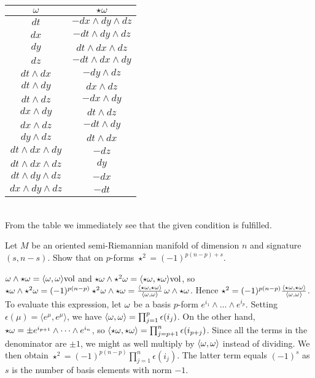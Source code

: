 \begin{tabular}{c|c}
$\omega$ & $\star\omega$\\\hline
$dt$ & $-dx\wedge dy\wedge dz$\\
$dx$ & $-dt\wedge dy\wedge dz$ \\
$dy$ & $dt\wedge dx\wedge dz$\\
$dz$ & $-dt\wedge dx\wedge dy$\\
$dt\wedge dx$ & $-dy\wedge dz$\\
$dt\wedge dy$ & $dx\wedge dz$ \\
$dt\wedge dz$ &$-dx\wedge dy$\\
$dx \wedge dy$ & $dt\wedge dz$ \\
$dx \wedge dz$ & $-dt\wedge dy$\\
$dy \wedge dz$ & $dt\wedge dx$\\
$dt\wedge dx\wedge dy$ & $-dz$ \\
$dt\wedge dx\wedge dz$ & $dy$\\
$dt\wedge dy\wedge dz$ & $-dx$\\
$dx\wedge dy\wedge dz$ & $-dt$
\end{tabular}\\

From the table we immediately see that the given condition is fulfilled.

\begin{p}{Let $M$ be an oriented semi-Riemannian manifold of dimension
$n$ and signature $(s,n{-}s)$. Show that on $p$-forms $\star^2=(-1)^{p(n-p)+s}$.}
\end{p}

$\omega\wedge \star \omega=\langle \omega,\omega\rangle {\rm vol}$ and $\star\omega \wedge \star^2\omega=\langle \star\omega,
\star\omega\rangle{\rm vol}$, so $\star\omega \wedge \star^2\omega=(-1)^{p(n{-}p)}\star^2\!\omega\wedge \star\omega=
\frac{\langle \star\omega, \star\omega\rangle}{\langle \omega,\omega\rangle}\,\omega\wedge\star\omega$. Hence
$\star^2=(-1)^{p(n{-}p)}\frac{\langle \star\omega, \star\omega\rangle}{\langle \omega,\omega\rangle}$. 
To evaluate this expression,
let $\omega$ be a basis $p$-form $e^{i_1}\wedge\dots\wedge e^{i_p}$. 
Setting $\epsilon(\mu)=\langle e^\mu,e^\mu\rangle$, we have 
$\langle\omega,\omega\rangle=\prod_{j=1}^p \epsilon(i_j)$. On the other hand, 
$\star\omega=\pm e^{i_{p+1}}\wedge\dots\wedge e^{i_n}$, so $\langle \star\omega,\star\omega\rangle=
\prod_{j=p+1}^n \epsilon(i_{p+j})$. Since all the terms in the denominator are $\pm 1$, we might as
well multiply by $\langle\omega,\omega\rangle$ instead of dividing. We then obtain
$\star^2=(-1)^{p(n{-}p)}\prod_{j=1}^n \epsilon(i_j)$. The latter term equals $(-1)^s$ as $s$ is the 
number of basis elements with norm $-1$.

